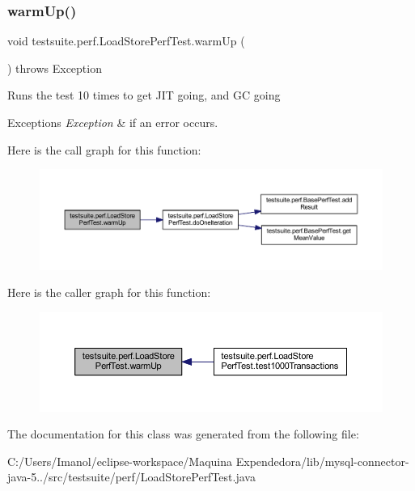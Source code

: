 \subsubsection{\texorpdfstring{warm\+Up()}{warmUp()}}
{\footnotesize\ttfamily void testsuite.\+perf.\+Load\+Store\+Perf\+Test.\+warm\+Up (\begin{DoxyParamCaption}{ }\end{DoxyParamCaption}) throws Exception\hspace{0.3cm}{\ttfamily [protected]}}

Runs the test 10 times to get J\+IT going, and GC going


\begin{DoxyExceptions}{Exceptions}
{\em Exception} & if an error occurs. \\
\hline
\end{DoxyExceptions}
Here is the call graph for this function\+:
\nopagebreak
\begin{figure}[H]
\begin{center}
\leavevmode
\includegraphics[width=350pt]{classtestsuite_1_1perf_1_1_load_store_perf_test_aedfa3a61f8e71a59e738a6b6e9d27d0e_cgraph}
\end{center}
\end{figure}
Here is the caller graph for this function\+:
\nopagebreak
\begin{figure}[H]
\begin{center}
\leavevmode
\includegraphics[width=350pt]{classtestsuite_1_1perf_1_1_load_store_perf_test_aedfa3a61f8e71a59e738a6b6e9d27d0e_icgraph}
\end{center}
\end{figure}


The documentation for this class was generated from the following file\+:\begin{DoxyCompactItemize}
\item 
C\+:/\+Users/\+Imanol/eclipse-\/workspace/\+Maquina Expendedora/lib/mysql-\/connector-\/java-\/5../src/testsuite/perf/Load\+Store\+Perf\+Test.\+java\end{DoxyCompactItemize}

